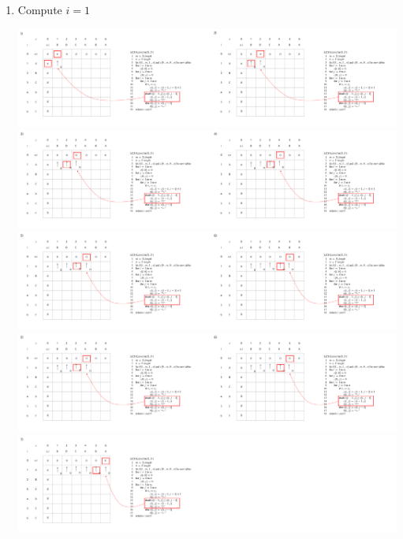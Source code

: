 \documentclass[12pt]{article}
\begin{document}
\begin{enumerate}[1.]
\begin{itemize}
\begin{itemize}
\begin{enumerate}[1.]
\begin{enumerate}[1)]
                    \item Compute $i = 1$

                    \bigskip

                    \begin{center}
                    \includegraphics[width=\linewidth]{images/worksheet_3_solution_13.png}
                    \includegraphics[width=\linewidth]{images/worksheet_3_solution_14.png}
                    \includegraphics[width=\linewidth]{images/worksheet_3_solution_15.png}
                    \includegraphics[width=\linewidth]{images/worksheet_3_solution_15.png}
                    \includegraphics[width=\linewidth]{images/worksheet_3_solution_16.png}
                    \end{center}


\end{enumerate}
\end{enumerate}
\end{itemize}
\end{itemize}
\end{enumerate}
\end{document}
